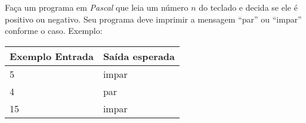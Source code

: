 
\item Faça um programa em \emph{Pascal} que leia um número $n$ do teclado
e decida se ele é positivo ou negativo. Seu programa deve imprimir
a mensagem ``par'' ou ``impar'' conforme o caso. Exemplo:

\begin{center}
\begin{tabular}{|l|l|} \hline
Exemplo Entrada & Saída esperada \\ \hline
5                & impar         \\ \hline
4                & par           \\ \hline
15               & impar         \\ \hline
\end{tabular}
\end{center}
